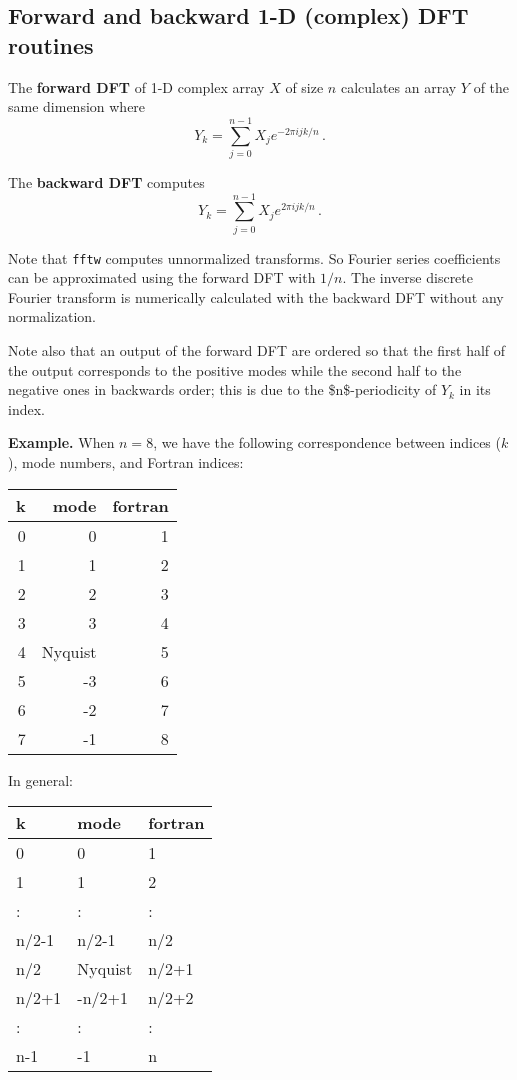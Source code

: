 \documentclass[11pt]{article}
\begin{document}
\subsection{Forward and backward 1-D (complex) DFT routines}
\label{sec:org82f6eeb}
The \textbf{forward DFT} of 1-D complex array \(X\) of size \(n\) calculates an
array \(Y\) of the same dimension where
\[
Y_k = \sum_{j=0}^{n-1} X_j e^{-2\pi i j k / n} \,.
\]

The \textbf{backward DFT} computes
\[
Y_k = \sum_{j=0}^{n-1} X_j e^{2\pi i j k / n} \,.
\]

Note that \texttt{fftw} computes unnormalized transforms. So Fourier series
coefficients can be approximated using the forward DFT with \(1/n\). The
inverse discrete Fourier transform is numerically calculated with the
backward DFT without any normalization.

Note also that an output of the forward DFT are ordered so that the
first half of the output corresponds to the positive modes while the
second half to the negative ones in backwards order; this is due to
the \$n\$-periodicity of \(Y_k\) in its index.

\textbf{Example.} When \(n = 8\), we have the following correspondence between indices (\(k\)), mode numbers, and Fortran indices:

\begin{center}
\begin{tabular}{rrr}
k & mode & fortran\\
\hline
0 & 0 & 1\\
1 & 1 & 2\\
2 & 2 & 3\\
3 & 3 & 4\\
4 & Nyquist & 5\\
5 & -3 & 6\\
6 & -2 & 7\\
7 & -1 & 8\\
\end{tabular}
\end{center}

In general:
\begin{center}
\begin{tabular}{lll}
k & mode & fortran\\
\hline
0 & 0 & 1\\
1 & 1 & 2\\
: & : & :\\
n/2-1 & n/2-1 & n/2\\
n/2 & Nyquist & n/2+1\\
n/2+1 & -n/2+1 & n/2+2\\
: & : & :\\
n-1 & -1 & n\\
\end{tabular}
\end{center}
\end{document}
